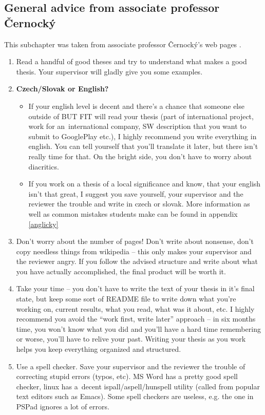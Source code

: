 \subsection*{General advice from associate professor Černocký}

This subchapter was taken from associate professor Černocký's web pages \cite{Cernocky}.

\begin{enumerate}
  \item{Read a handful of good theses and try to understand what makes a good thesis. Your supervisor will gladly give you some examples.}
  \item{\textbf{Czech/Slovak or English?}
  	\begin{itemize}
  	\item If your english level is decent and there's a chance that someone else outside of BUT FIT will read your thesis (part of international project, work for an~international company, SW description that you want to submit to GooglePlay etc.), I highly recommend you write everything in english. You can tell yourself that you'll translate it later, but there isn't really time for that. On the bright side, you don't have to worry about diacritics.
    \item If you work on a thesis of a local significance and know, that your english isn't that great, I suggest you save yourself, your supervisor and the reviewer the trouble and write in czech or slovak. More information as well as common mistakes students make can be found in appendix \ref{anglicky}
  	\end{itemize}
  }
  \item{Don't worry about the number of pages! Don't write about nonsense, don't copy needless things from wikipedia -- this only makes your supervisor and the reviewer angry. If you follow the advised structure and write about what you have actually accomplished, the final product will be worth it.}
  \item{Take your time -- you don't have to write the text of your thesis in it's final state, but keep some sort of README file to write down what you're working on, current results, what you read, what was it about, etc. I highly recommend you avoid the ``work first, write later'' approach -- in six months time, you won't know what you did and you'll have a hard time remembering or worse, you'll have to relive your past. Writing your thesis as you work helps you keep everything organized and structured.}
  \item{Use a spell checker. Save your supervisor and the reviewer the trouble of correcting stupid errors (typos, etc). MS Word has a pretty good spell checker, linux has a~decent ispall/aspell/hunspell utility (called from popular text editors such as Emacs). Some spell checkers are useless, e.g. the one in PSPad ignores a lot of errors.}

\end{enumerate}
